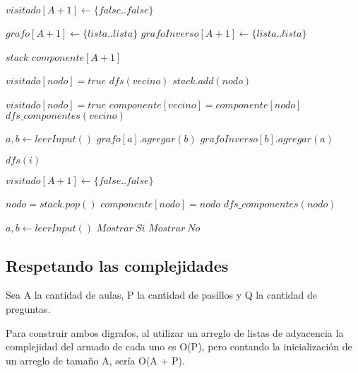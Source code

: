 \begin{algorithmic}

\State $visitado[A + 1] \gets \{false..false\}$

\State $grafo[A + 1] \gets \{lista..lista\}$
\State $grafoInverso[A + 1] \gets \{lista..lista\}$

\State $stack$
\State $componente[A + 1]$

	\State $visitado[nodo] = true$
			\State $dfs(vecino)$
		\EndIf
	\EndFor
	\State $stack.add(nodo)$
\EndFunction

	\State $visitado[nodo] = true$
			\State $componente[vecino] = componente[nodo]$
			\State $dfs\_componentes(vecino)$
		\EndIf
	\EndFor
\EndFunction


    	\State $a, b \gets leerInput()$
    	\State $grafo[a].agregar(b)$
    	\State $grafoInverso[b].agregar(a)$
    \EndFor

    		\State $dfs(i)$
    	\EndIf
    \EndFor

    \State $visitado[A + 1] \gets \{false..false\}$

    	\State $nodo = stack.pop()$
    		\State $componente[nodo] = nodo$
    		\State $dfs\_componentes(nodo)$
    	\EndIf
    \EndWhile

    	\State $a, b \gets leerInput()$
    		\State $Mostrar\ Si$
    	\EndIf
    		\State $Mostrar\ No$
    	\EndIf   	
    \EndFor

\EndFunction

\end{algorithmic}


\subsection{Respetando las complejidades}

Sea A la cantidad de aulas, P la cantidad de pasillos y Q la cantidad de preguntas.\newline

Para construir ambos digrafos, al utilizar un arreglo de listas de adyacencia la complejidad del armado de cada uno es O(P), pero contando la inicialización de un arreglo de tamaño A, sería O(A + P).\newline

